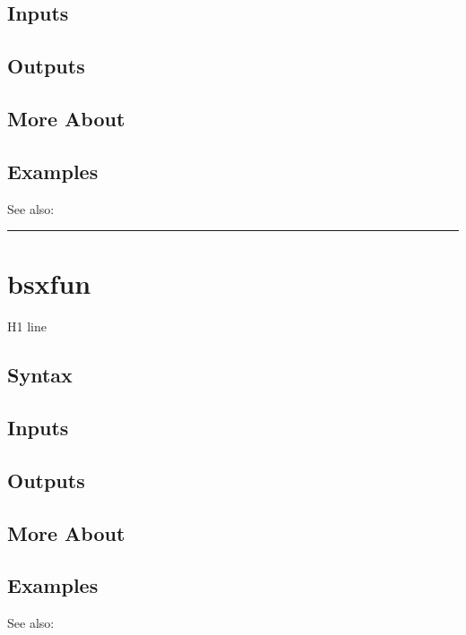 \documentclass[letterpaper,10pt,english]{sphinxmanual}
\begin{document}
\subsection{Inputs}
\label{classes/time_series/@ts/ts:id91}

\subsection{Outputs}
\label{classes/time_series/@ts/ts:id92}

\subsection{More About}
\label{classes/time_series/@ts/ts:id93}

\subsection{Examples}
\label{classes/time_series/@ts/ts:id94}
See also:


\bigskip\hrule{}\bigskip



\section{bsxfun}
\label{classes/time_series/@ts/ts:bsxfun}\label{classes/time_series/@ts/ts:id95}
H1 line


\subsection{Syntax}
\label{classes/time_series/@ts/ts:id96}

\subsection{Inputs}
\label{classes/time_series/@ts/ts:id97}

\subsection{Outputs}
\label{classes/time_series/@ts/ts:id98}

\subsection{More About}
\label{classes/time_series/@ts/ts:id99}

\subsection{Examples}
\label{classes/time_series/@ts/ts:id100}
See also:
\end{document}
